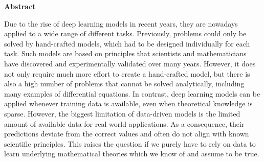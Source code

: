 


\vspace*{2cm}
\begin{center}
{\Large \textbf{Abstract}}
\end{center}
\vspace{1cm}


Due to the rise of deep learning models in recent years, they are nowadays applied to a wide range of different tasks. Previously, problems could only be solved by hand-crafted models, which had to be designed individually for each task. Such models are based on principles that scientists and mathematicians have discovered and experimentally validated over many years. However, it does not only require much more effort to create a hand-crafted model, but there is also a high number of problems that cannot be solved analytically, including many examples of differential equations. In contrast, deep learning models can be applied whenever training data is available, even when theoretical knowledge is sparse. However, the biggest limitation of data-driven models is the limited amount of available data for real world applications. As a consequence, their predictions deviate from the correct values and often do not align with known scientific principles. This raises the question if we purely have to rely on data to learn underlying mathematical theories which we know of and assume to be true.




